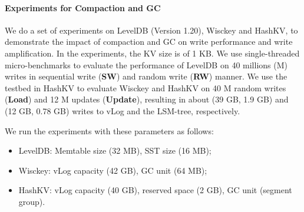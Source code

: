 \documentclass[sigconf]{acmart}
\begin{document}
\paragraph{Experiments for Compaction and GC} We do a set of experiments on LevelDB (Version 1.20), Wisckey and HashKV, to demonstrate the impact of compaction and GC on write performance and write amplification. In the experiments, the KV size is of 1 KB. We use single-threaded micro-benchmarks to evaluate the performance of LevelDB on 40 millions (M) writes in sequential write (\textbf{SW}) and random write (\textbf{RW}) manner. We use the testbed in HashKV \cite{HashKV} to evaluate Wisckey and HashKV on 40 M random writes (\textbf{Load}) and 12 M updates (\textbf{Update}), resulting in about (39 GB, 1.9 GB) and (12 GB, 0.78 GB) writes to vLog and the LSM-tree, respectively. 

We run the experiments with these parameters as follows:
\begin{itemize}
	\item LevelDB: Memtable size (32 MB), SST size (16 MB); 
	\item Wisckey: vLog capacity (42 GB), GC unit (64 MB); 
	\item HashKV: vLog capacity (40 GB), reserved space (2 GB), GC unit (segment group).
\end{itemize}

\end{document}
